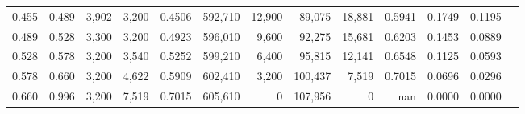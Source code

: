 \begin{tabular}{rrrrrrrrrrrrr}
0.455 & 0.489 &   3,902 & 3,200 &                                     0.4506 & 592,710 &  12,900 &  89,075 &  18,881 & 0.5941 & 0.1749 & 0.1195 \\
0.489 & 0.528 &   3,300 & 3,200 &                                     0.4923 & 596,010 &   9,600 &  92,275 &  15,681 & 0.6203 & 0.1453 & 0.0889 \\
0.528 & 0.578 &   3,200 & 3,540 &                                     0.5252 & 599,210 &   6,400 &  95,815 &  12,141 & 0.6548 & 0.1125 & 0.0593 \\
0.578 & 0.660 &   3,200 & 4,622 &                                     0.5909 & 602,410 &   3,200 & 100,437 &   7,519 & 0.7015 & 0.0696 & 0.0296 \\
0.660 & 0.996 &   3,200 & 7,519 &                                     0.7015 & 605,610 &       0 & 107,956 &       0 &    nan & 0.0000 & 0.0000 \\
\bottomrule
\end{tabular}
